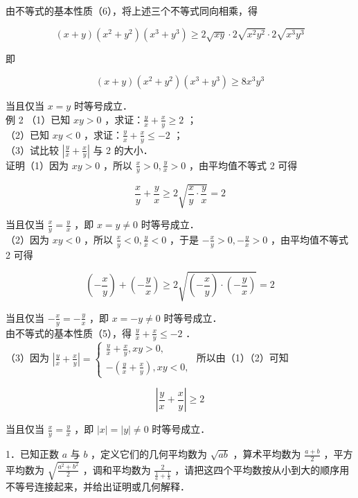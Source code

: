 \documentclass[10pt]{article}
\begin{document}
由不等式的基本性质（6），将上述三个不等式同向相乘，得

\[
(x+y)\left(x^{2}+y^{2}\right)\left(x^{3}+y^{3}\right) \geqslant 2 \sqrt{x y} \cdot 2 \sqrt{x^{2} y^{2}} \cdot 2 \sqrt{x^{3} y^{3}}
\]

即

\[
(x+y)\left(x^{2}+y^{2}\right)\left(x^{3}+y^{3}\right) \geqslant 8 x^{3} y^{3}
\]

当且仅当 \(x=y\) 时等号成立．\\
例 2 （1）已知 \(x y>0\) ，求证：\(\frac{y}{x}+\frac{x}{y} \geqslant 2\) ；\\
（2）已知 \(x y<0\) ，求证：\(\frac{y}{x}+\frac{x}{y} \leqslant-2\) ；\\
（3）试比较 \(\left|\frac{y}{x}+\frac{x}{y}\right|\) 与 2 的大小．\\
证明（1）因为 \(x y>0\) ，所以 \(\frac{x}{y}>0, \frac{y}{x}>0\) ，由平均值不等式 2 可得

\[
\frac{x}{y}+\frac{y}{x} \geqslant 2 \sqrt{\frac{x}{y} \cdot \frac{y}{x}}=2
\]

当且仅当 \(\frac{x}{y}=\frac{y}{x}\) ，即 \(x=y \neq 0\) 时等号成立．\\
（2）因为 \(x y<0\) ，所以 \(\frac{x}{y}<0, \frac{y}{x}<0\) ，于是 \(-\frac{x}{y}>0,-\frac{y}{x}>0\) ，由平均值不等式 2 可得

\[
\left(-\frac{x}{y}\right)+\left(-\frac{y}{x}\right) \geqslant 2 \sqrt{\left(-\frac{x}{y}\right) \cdot\left(-\frac{y}{x}\right)}=2
\]

当且仅当 \(-\frac{x}{y}=-\frac{y}{x}\) ，即 \(x=-y \neq 0\) 时等号成立．\\
由不等式的基本性质（5），得 \(\frac{y}{x}+\frac{x}{y} \leqslant-2\) ．\\
（3）因为 \(\left|\frac{y}{x}+\frac{x}{y}\right|=\left\{\begin{array}{l}\frac{y}{x}+\frac{x}{y}, x y>0, \\ -\left(\frac{y}{x}+\frac{x}{y}\right), x y<0,\end{array}\right.\) 所以由（1）（2）可知

\[
\left|\frac{y}{x}+\frac{x}{y}\right| \geqslant 2
\]

当且仅当 \(\frac{x}{y}=\frac{y}{x}\) ，即 \(|x|=|y| \neq 0\) 时等号成立．

1．已知正数 \(a\) 与 \(b\) ，定义它们的几何平均数为 \(\sqrt{a b}\) ，算术平均数为 \(\frac{a+b}{2}\) ，平方平均数为 \(\sqrt{\frac{a^{2}+b^{2}}{2}}\) ，调和平均数为 \(\frac{2}{\frac{1}{a}+\frac{1}{b}}\) ，请把这四个平均数按从小到大的顺序用不等号连接起来，并给出证明或几何解释．
\end{document}
